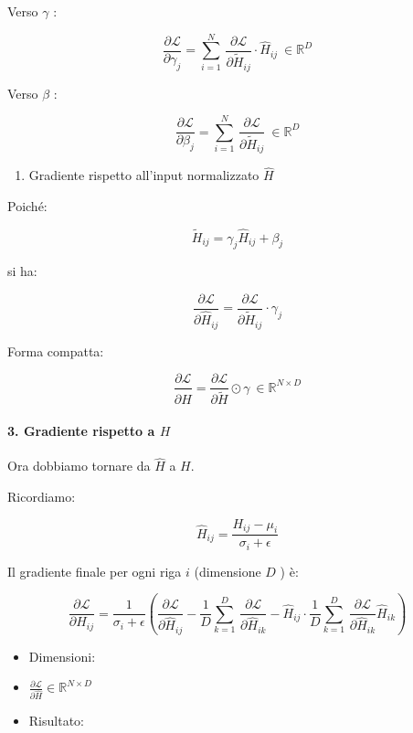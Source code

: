 \documentclass[
  11pt,
]{article}
\begin{document}
Verso \(\gamma\) :

\[\frac{\partial\mathcal{L}}{\partial\gamma_{j}} = \sum_{i = 1}^{N}\,\frac{\partial\mathcal{L}}{\partial{\widetilde{H}}_{ij}} \cdot {\widehat{H}}_{ij}\  \in \mathbb{R}^{D}\]

Verso \(\beta\) :

\[\frac{\partial\mathcal{L}}{\partial\beta_{j}} = \sum_{i = 1}^{N}\,\frac{\partial\mathcal{L}}{\partial{\widetilde{H}}_{ij}}\  \in \mathbb{R}^{D}\]

\begin{enumerate}
\def\labelenumi{\arabic{enumi}.}
\setcounter{enumi}{1}
\item
  Gradiente rispetto all'input normalizzato
  \(\widehat{H}\)
\end{enumerate}

Poiché:

\[{\widetilde{H}}_{ij} = \gamma_{j}{\widehat{H}}_{ij} + \beta_{j}\]

si ha:

\[\frac{\partial\mathcal{L}}{\partial{\widehat{H}}_{ij}} = \frac{\partial\mathcal{L}}{\partial{\widetilde{H}}_{ij}} \cdot \gamma_{j}\]

Forma compatta:

\[\frac{\partial\mathcal{L}}{\partial\widehat{H}} = \frac{\partial\mathcal{L}}{\partial\widetilde{H}} \odot \gamma\  \in \mathbb{R}^{N \times D}\]

\paragraph{3. Gradiente rispetto a $H$}

Ora dobbiamo tornare da \(\widehat{H}\) a \(H\).

Ricordiamo:

\[{\widehat{H}}_{ij} = \frac{H_{ij} - \mu_{i}}{\sigma_{i} + \epsilon}\]

Il gradiente finale per ogni riga \(i\) (dimensione \(D\) ) è:

\[\frac{\partial\mathcal{L}}{\partial H_{ij}} = \frac{1}{\sigma_{i} + \epsilon}\left( \frac{\partial\mathcal{L}}{\partial{\widehat{H}}_{ij}} - \frac{1}{D}\sum_{k = 1}^{D}\,\frac{\partial\mathcal{L}}{\partial{\widehat{H}}_{ik}} - {\widehat{H}}_{ij} \cdot \frac{1}{D}\sum_{k = 1}^{D}\,\frac{\partial\mathcal{L}}{\partial{\widehat{H}}_{ik}}{\widehat{H}}_{ik} \right)\]

\begin{itemize}
\item
  Dimensioni:
\item
  \(\frac{\partial\mathcal{L}}{\partial\widehat{H}} \in \mathbb{R}^{N \times D}\)
\item
  Risultato:
\end{itemize}
\end{document}
